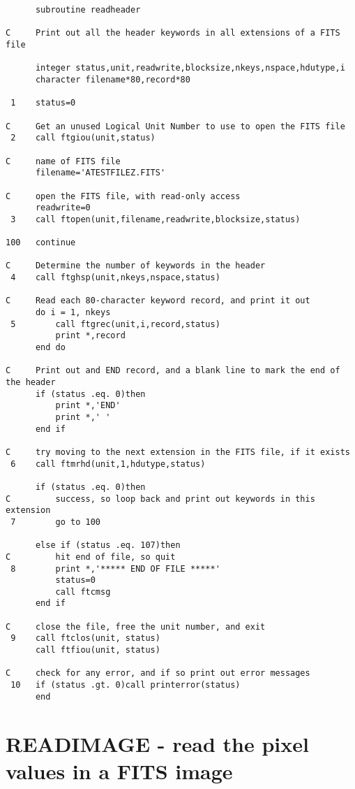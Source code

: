 \newpage
\footnotesize
\begin{verbatim}
      subroutine readheader

C     Print out all the header keywords in all extensions of a FITS file

      integer status,unit,readwrite,blocksize,nkeys,nspace,hdutype,i
      character filename*80,record*80

 1    status=0

C     Get an unused Logical Unit Number to use to open the FITS file
 2    call ftgiou(unit,status)

C     name of FITS file 
      filename='ATESTFILEZ.FITS'

C     open the FITS file, with read-only access
      readwrite=0
 3    call ftopen(unit,filename,readwrite,blocksize,status)

100   continue

C     Determine the number of keywords in the header
 4    call ftghsp(unit,nkeys,nspace,status)

C     Read each 80-character keyword record, and print it out
      do i = 1, nkeys
 5        call ftgrec(unit,i,record,status)
          print *,record
      end do

C     Print out and END record, and a blank line to mark the end of the header
      if (status .eq. 0)then
          print *,'END'
          print *,' '
      end if

C     try moving to the next extension in the FITS file, if it exists
 6    call ftmrhd(unit,1,hdutype,status)

      if (status .eq. 0)then
C         success, so loop back and print out keywords in this extension
 7        go to 100

      else if (status .eq. 107)then
C         hit end of file, so quit
 8        print *,'***** END OF FILE *****'
          status=0
          call ftcmsg
      end if

C     close the file, free the unit number, and exit
 9    call ftclos(unit, status)
      call ftfiou(unit, status)

C     check for any error, and if so print out error messages
 10   if (status .gt. 0)call printerror(status)
      end
\end{verbatim}
\normalsize
\newpage
\section{READIMAGE - read the pixel values in a FITS image}

